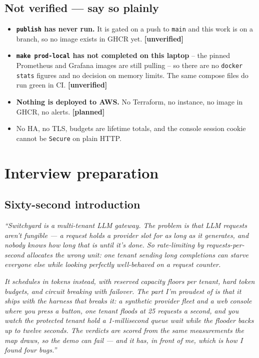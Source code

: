 \documentclass[10pt,a4paper]{article}
\newcommand{\unver}{\textcolor{warn}{\textbf{[unverified]}}}
\newcommand{\plan}{\textcolor{bad}{\textbf{[planned]}}}
\begin{document}
\subsection{Not verified — say so plainly}

\begin{itemize}
\item \textbf{\texttt{publish} has never run.} It is gated on a push to
  \texttt{main} and this work is on a branch, so no image exists in GHCR
  yet. \unver
\item \textbf{\texttt{make prod-local} has not completed on this laptop} --
  the pinned Prometheus and Grafana images are still pulling -- so there are
  no \texttt{docker stats} figures and no decision on memory limits. The same
  compose files do run green in CI. \unver
\item \textbf{Nothing is deployed to AWS.} No Terraform, no instance, no
  image in GHCR, no alerts. \plan
\item No HA, no TLS, budgets are lifetime totals, and the console session
  cookie cannot be \texttt{Secure} on plain HTTP.
\end{itemize}

\section{Interview preparation}

\subsection{Sixty-second introduction}

\textit{``Switchyard is a multi-tenant LLM gateway. The problem is that LLM
requests aren't fungible — a request holds a provider slot for as long as it
generates, and nobody knows how long that is until it's done. So rate-limiting
by requests-per-second allocates the wrong unit: one tenant sending long
completions can starve everyone else while looking perfectly well-behaved on a
request counter.}

\textit{It schedules in tokens instead, with reserved capacity floors per
tenant, hard token budgets, and circuit breaking with failover. The part I'm
proudest of is that it ships with the harness that breaks it: a synthetic
provider fleet and a web console where you press a button, one tenant floods
at 25 requests a second, and you watch the protected tenant hold a 1-millisecond
queue wait while the flooder backs up to twelve seconds. The verdicts are
scored from the same measurements the map draws, so the demo can fail — and it
has, in front of me, which is how I found four bugs.''}
\end{document}
